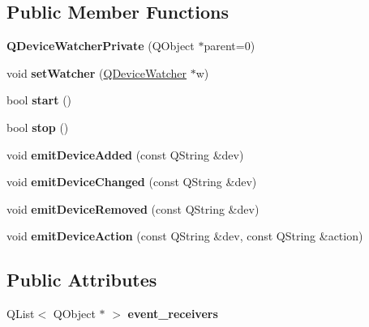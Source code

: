 \subsection*{Public Member Functions}
\begin{DoxyCompactItemize}
\item 
\mbox{\label{class_q_device_watcher_private_a09d7ca58dad62fd18e8579a2c118bc29}} 
{\bfseries Q\+Device\+Watcher\+Private} (Q\+Object $\ast$parent=0)
\item 
\mbox{\label{class_q_device_watcher_private_a9026e716f3e5996a06dc36d3864f9509}} 
void {\bfseries set\+Watcher} (\mbox{\hyperlink{class_q_device_watcher}{Q\+Device\+Watcher}} $\ast$w)
\item 
\mbox{\label{class_q_device_watcher_private_aae86c1f1f256617bf5428a1aeae85940}} 
bool {\bfseries start} ()
\item 
\mbox{\label{class_q_device_watcher_private_a9b910bac83dbf1389a2a7d7a6396fea8}} 
bool {\bfseries stop} ()
\item 
\mbox{\label{class_q_device_watcher_private_a83f9f96895f2cd8f98d48a5ef22a102d}} 
void {\bfseries emit\+Device\+Added} (const Q\+String \&dev)
\item 
\mbox{\label{class_q_device_watcher_private_aee776fb4b91cbef5d2f115de46c68d47}} 
void {\bfseries emit\+Device\+Changed} (const Q\+String \&dev)
\item 
\mbox{\label{class_q_device_watcher_private_a644476ae42b84a95f28a0e60dcbdc058}} 
void {\bfseries emit\+Device\+Removed} (const Q\+String \&dev)
\item 
\mbox{\label{class_q_device_watcher_private_a15b87c7075a49ac244a34a5dbe8ed954}} 
void {\bfseries emit\+Device\+Action} (const Q\+String \&dev, const Q\+String \&action)
\end{DoxyCompactItemize}
\subsection*{Public Attributes}
\begin{DoxyCompactItemize}
\item 
\mbox{\label{class_q_device_watcher_private_a5a370eb80faf353c335541283e455b7f}} 
Q\+List$<$ Q\+Object $\ast$ $>$ {\bfseries event\+\_\+receivers}
\end{DoxyCompactItemize}


